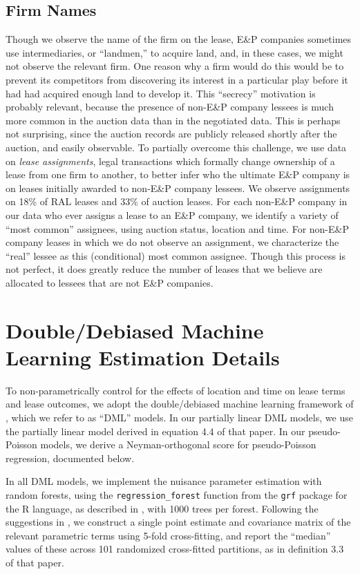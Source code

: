 \begin{appendices}
\subsection{Firm Names \label{sec:FirmNameCleaning}}
Though we observe the name of the firm on the lease, E\&P companies sometimes use intermediaries, or ``landmen,'' to acquire land, and, in these cases, we might not observe the relevant firm. One reason why a firm would do this would be to prevent its competitors from discovering its interest in a particular play before it had had acquired enough land to develop it. This ``secrecy'' motivation is probably relevant, because the presence of non-E\&P company lessees is much more common in the auction data than in the negotiated data. This is perhaps not surprising, since the auction records are publicly released shortly after the auction, and easily observable.  To partially overcome this challenge, we use data on \textit{lease assignments}, legal transactions which formally change ownership of a lease from one firm to another, to better infer who the ultimate E\&P company is on leases initially awarded to non-E\&P company lessees. We observe assignments on 18\% of RAL leases and 33\% of auction leases. For each non-E\&P company in our data who ever assigns a lease to an E\&P company, we identify a variety of ``most common'' assignees, using auction status, location and time.  For non-E\&P company leases in which we do not observe an assignment, we characterize the ``real'' lessee as this (conditional) most common assignee.  Though this process is not perfect, it does greatly reduce the number of leases that we believe are allocated to lessees that are not E\&P companies.

\pagebreak

\section{Double/Debiased Machine Learning Estimation Details}\label{sec:dml}

To non-parametrically control for the effects of location and time on lease terms and lease outcomes, we adopt the double/debiased machine learning framework of \cite{chernozhukov2018double}, which we refer to as ``DML'' models.  In our partially linear DML models, we use the partially linear model derived in equation 4.4 of that paper.  In our pseudo-Poisson models, we derive a Neyman-orthogonal score for pseudo-Poisson regression, documented below.  

In all DML models, we implement the nuisance parameter estimation with random forests, using the \texttt{regression\_forest} function from the \texttt{grf} package for the R language, as described in \cite{athey2019generalized}, with 1000 trees per forest.  Following the suggestions in \cite{chernozhukov2018double}, we construct a single point estimate and covariance matrix of the relevant parametric terms using 5-fold cross-fitting, and report the ``median'' values of these across 101 randomized cross-fitted partitions, as in definition 3.3 of that paper. 


\end{appendices}
